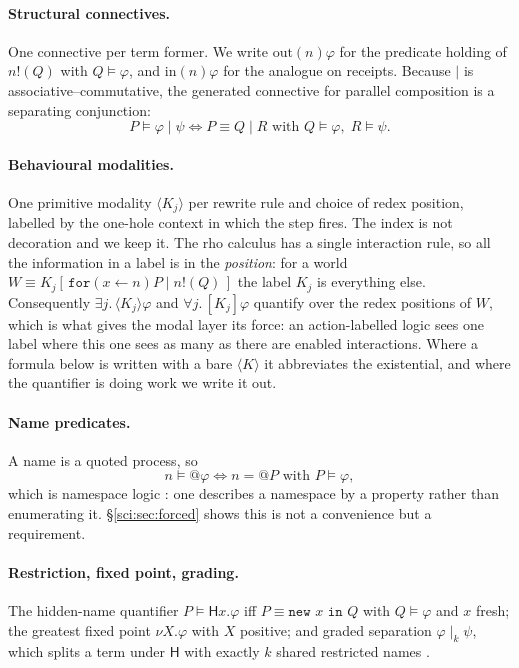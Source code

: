 \paragraph{Structural connectives.} One connective per term former. We write $\mathrm{out}(n)\varphi$
for the predicate holding of $n!(Q)$ with $Q \models \varphi$, and $\mathrm{in}(n)\varphi$ for the
analogue on receipts. Because $\mid$ is associative--commutative, the generated connective for
parallel composition is a separating conjunction:
\[
P \models \varphi \mid \psi \iff P \equiv Q \mid R \text{ with } Q \models \varphi,\; R \models \psi .
\]

\paragraph{Behavioural modalities.} One primitive modality $\langle K_j \rangle$ per rewrite rule and
choice of redex position, labelled by the one-hole context in which the step fires. The index is not
decoration and we keep it. The rho calculus has a single interaction rule, so all the information in
a label is in the \emph{position}: for a world $W \equiv K_j[\,\texttt{for}(x \leftarrow n)P \mid
n!(Q)\,]$ the label $K_j$ is everything else. Consequently $\exists j.\,\langle K_j\rangle\varphi$
and $\forall j.\,[K_j]\varphi$ quantify over the redex positions of $W$, which is what gives the
modal layer its force: an action-labelled logic sees one label where this one sees as many as there
are enabled interactions. Where a formula below is written with a bare $\langle K\rangle$ it
abbreviates the existential, and where the quantifier is doing work we write it out.

\paragraph{Name predicates.} A name is a quoted process, so
\[
n \models @\varphi \iff n = @P \text{ with } P \models \varphi ,
\]
which is namespace logic \cite{NamespaceLogic}: one describes a namespace by a property rather than
enumerating it. \S\ref{sci:sec:forced} shows this is not a convenience but a requirement.

\paragraph{Restriction, fixed point, grading.} The hidden-name quantifier
$P \models \mathsf{H}x.\varphi$ iff $P \equiv \texttt{new } x \texttt{ in } Q$ with
$Q \models \varphi$ and $x$ fresh; the greatest fixed point $\nu X.\varphi$ with $X$ positive; and
graded separation $\varphi \mid_k \psi$, which splits a term under $\mathsf{H}$ with exactly $k$
shared restricted names \cite[\S2.3]{ClassifierNote}.

